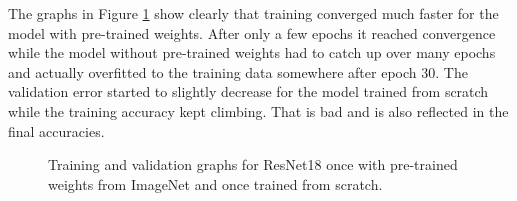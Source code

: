 \begin{table}[h] \centering
{}
\caption{Hyper parameters for ResNet18 optimized with SigOpt. First row shows hyperparameters training the architecture from scratch. Second row used pre-trained weights from ImageNet}
\label{tbl:ResNet18}
\end{table}

The graphs in Figure \ref{fig:resnet18-graph} show clearly that training converged much faster for the model with pre-trained weights. After only a few epochs it reached convergence while the model without pre-trained weights had to catch up over many epochs and actually overfitted to the training data somewhere after epoch 30. The validation error started to slightly decrease for the model trained from scratch while the training accuracy kept climbing. That is bad and is also reflected in the final accuracies.

\begin{figure}[h]
\centering
{}
\caption{Training and validation graphs for ResNet18 once with pre-trained weights from ImageNet and once trained from scratch.}
\label{fig:resnet18-graph}
\end{figure}

